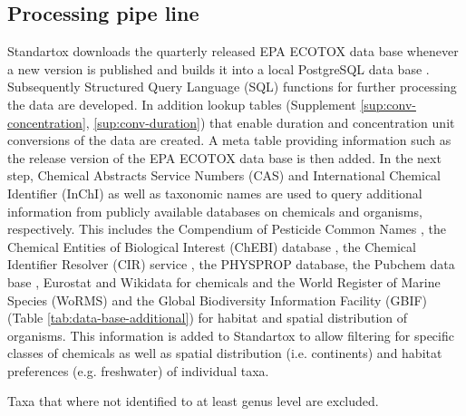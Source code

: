 \subsection{Processing pipe line}
Standartox downloads the quarterly released EPA ECOTOX data base whenever a new version is published and builds it into a local PostgreSQL data base \citep{szocs_build_2019}. Subsequently Structured Query Language (SQL) functions for further processing the data are developed. In addition lookup tables (Supplement \ref{sup:conv-concentration}, \ref{sup:conv-duration}) that enable duration and concentration unit conversions of the data are created. A meta table providing information such as the release version of the EPA ECOTOX data base is then added. In the next step, Chemical Abstracts Service Numbers (CAS) and International Chemical Identifier (InChI) as well as taxonomic names are used to query additional information from publicly available databases on chemicals and organisms, respectively. This includes the Compendium of Pesticide Common Names \citep{wood_compendium_2019}, the Chemical Entities of Biological Interest (ChEBI) database \citep{hastings_chebi_2016}, the Chemical Identifier Resolver (CIR) service \citep{nationalinstitutesofhealthnih_chemical_2019}, the PHYSPROP database, the Pubchem data base \citep{kim_pubchem_2016}, Eurostat \citep{europeancommission_eurostat_2019} and Wikidata \citep{vrandecic_wikidata_2014} for chemicals and the World Register of Marine Species (WoRMS) \citep{wormseditorialboard_world_2018} and the Global Biodiversity Information Facility (GBIF) \citep{_gbif_2019} (Table \ref{tab:data-base-additional}) for habitat and spatial distribution of organisms. This information is added to Standartox to allow filtering for specific classes of chemicals as well as spatial distribution (i.e. continents) and habitat preferences (e.g. freshwater) of individual taxa.

Taxa that where not identified to at least genus level are excluded.




